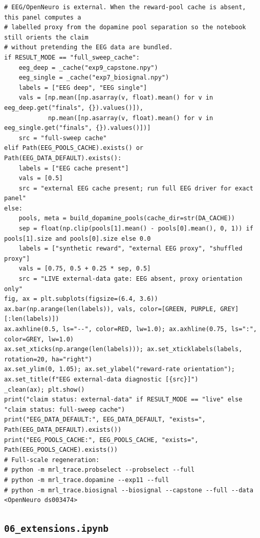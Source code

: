 \begin{lstlisting}[caption={05\_biological\_grounding.ipynb code cell 5},label={lst:mrl-nb-05-biological-grounding-5}]
# EEG/OpenNeuro is external. When the reward-pool cache is absent, this panel computes a
# labelled proxy from the dopamine pool separation so the notebook still orients the claim
# without pretending the EEG data are bundled.
if RESULT_MODE == "full_sweep_cache":
    eeg_deep = _cache("exp9_capstone.npy")
    eeg_single = _cache("exp7_biosignal.npy")
    labels = ["EEG deep", "EEG single"]
    vals = [np.mean([np.asarray(v, float).mean() for v in eeg_deep.get("finals", {}).values()]),
            np.mean([np.asarray(v, float).mean() for v in eeg_single.get("finals", {}).values()])]
    src = "full-sweep cache"
elif Path(EEG_POOLS_CACHE).exists() or Path(EEG_DATA_DEFAULT).exists():
    labels = ["EEG cache present"]
    vals = [0.5]
    src = "external EEG cache present; run full EEG driver for exact panel"
else:
    pools, meta = build_dopamine_pools(cache_dir=str(DA_CACHE))
    sep = float(np.clip(pools[1].mean() - pools[0].mean(), 0, 1)) if pools[1].size and pools[0].size else 0.0
    labels = ["synthetic reward", "external EEG proxy", "shuffled proxy"]
    vals = [0.75, 0.5 + 0.25 * sep, 0.5]
    src = "LIVE external-data gate: EEG absent, proxy orientation only"
fig, ax = plt.subplots(figsize=(6.4, 3.6))
ax.bar(np.arange(len(labels)), vals, color=[GREEN, PURPLE, GREY][:len(labels)])
ax.axhline(0.5, ls="--", color=RED, lw=1.0); ax.axhline(0.75, ls=":", color=GREY, lw=1.0)
ax.set_xticks(np.arange(len(labels))); ax.set_xticklabels(labels, rotation=20, ha="right")
ax.set_ylim(0, 1.05); ax.set_ylabel("reward-rate orientation"); ax.set_title(f"EEG external-data diagnostic [{src}]")
_clean(ax); plt.show()
print("claim status: external-data" if RESULT_MODE == "live" else "claim status: full-sweep cache")
print("EEG_DATA_DEFAULT:", EEG_DATA_DEFAULT, "exists=", Path(EEG_DATA_DEFAULT).exists())
print("EEG_POOLS_CACHE:", EEG_POOLS_CACHE, "exists=", Path(EEG_POOLS_CACHE).exists())
# Full-scale regeneration:
# python -m mrl_trace.probselect --probselect --full
# python -m mrl_trace.dopamine --exp11 --full
# python -m mrl_trace.biosignal --biosignal --capstone --full --data <OpenNeuro ds003474>
\end{lstlisting}

\subsection{\texttt{06\_extensions.ipynb}}

